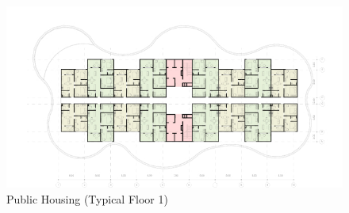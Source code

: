 \begin{figure}[H]
	\centering
	\includegraphics[width=\linewidth]{src/graphics/nurture--pub-housing-typical-floor-01.jpg}
	\caption*{%
		Public Housing (Typical Floor 1)
	}
	\label{
		fig:nurture--pub-housing-typical-floor-01
	}
\end{figure}
